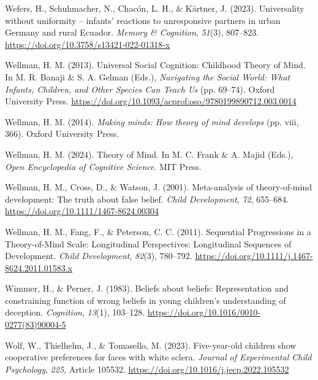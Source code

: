 \documentclass[
]{scrbook}
\newlength{\cslhangindent}
\newenvironment{CSLReferences}[2] %
 {\begin{list}{}{%
  \setlength{\itemindent}{0pt}
  \setlength{\leftmargin}{0pt}
  \setlength{\parsep}{0pt}
  \ifodd #1
   \setlength{\leftmargin}{\cslhangindent}
   \setlength{\itemindent}{-1\cslhangindent}
  \fi
  \setlength{\itemsep}{#2\baselineskip}}}
 {\end{list}}
\begin{document}
\begin{CSLReferences}{1}{0}
Wefers, H., Schuhmacher, N., Chacón, L. H., \& Kärtner, J. (2023). Universality without uniformity -- infants' reactions to unresponsive partners in urban {Germany} and rural {Ecuador}. \emph{Memory \& Cognition}, \emph{51}(3), 807--823. \url{https://doi.org/10.3758/s13421-022-01318-x}

Wellman, H. M. (2013). Universal {Social Cognition}: {Childhood Theory} of {Mind}. In M. R. Banaji \& S. A. Gelman (Eds.), \emph{Navigating the {Social World}: {What Infants}, {Children}, and {Other Species Can Teach Us}} (pp. 69--74). Oxford University Press. \url{https://doi.org/10.1093/acprof:oso/9780199890712.003.0014}

Wellman, H. M. (2014). \emph{Making minds: {How} theory of mind develops} (pp. viii, 366). Oxford University Press.

Wellman, H. M. (2024). Theory of {Mind}. In M. C. Frank \& A. Majid (Eds.), \emph{Open {Encyclopedia} of {Cognitive Science}}. MIT Press.

Wellman, H. M., Cross, D., \& Watson, J. (2001). Meta-analysis of theory-of-mind development: {The} truth about false belief. \emph{Child Development}, \emph{72}, 655--684. \url{https://doi.org/10.1111/1467-8624.00304}

Wellman, H. M., Fang, F., \& Peterson, C. C. (2011). Sequential {Progressions} in a {Theory-of-Mind Scale}: {Longitudinal Perspectives}: {Longitudinal Sequences} of {Development}. \emph{Child Development}, \emph{82}(3), 780--792. \url{https://doi.org/10.1111/j.1467-8624.2011.01583.x}

Wimmer, H., \& Perner, J. (1983). Beliefs about beliefs: {Representation} and constraining function of wrong beliefs in young children's understanding of deception. \emph{Cognition}, \emph{13}(1), 103--128. \url{https://doi.org/10.1016/0010-0277(83)90004-5}

Wolf, W., Thielhelm, J., \& Tomasello, M. (2023). Five-year-old children show cooperative preferences for faces with white sclera. \emph{Journal of Experimental Child Psychology}, \emph{225}, Article 105532. \url{https://doi.org/10.1016/j.jecp.2022.105532}


\end{CSLReferences}
\end{document}
